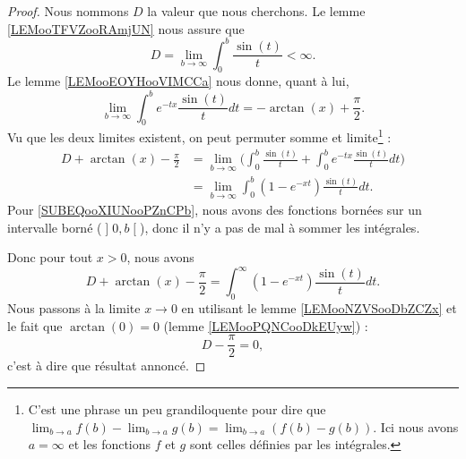 \begin{proof}
    Nous nommons \( D\) la valeur que nous cherchons. Le lemme \ref{LEMooTFVZooRAmjUN} nous assure que
    \begin{equation}
        D=\lim_{b\to \infty} \int_0^b\frac{ \sin(t) }{ t }<\infty.
    \end{equation}
    Le lemme \ref{LEMooEOYHooVIMCCa} nous donne, quant à lui,
    \begin{equation}
        \lim_{b\to \infty} \int_0^b e^{-tx}\frac{ \sin(t) }{ t }dt=-\arctan(x)+\frac{ \pi }{2}.
    \end{equation}
    Vu que les deux limites existent, on peut permuter somme et limite\footnote{C'est une phrase un peu grandiloquente pour dire que \( \lim_{b\to a} f(b)-\lim_{b\to a} g(b)=\lim_{b\to a} (f(b)-g(b))  \). Ici nous avons \( a=\infty\) et les fonctions \( f\) et \( g\) sont celles définies par les intégrales.} :
    \begin{subequations}
        \begin{align}
            D+\arctan(x)-\frac{ \pi }{2}&=\lim_{b\to \infty} \big(    \int_0^b\frac{ \sin(t) }{ t } +  \int_0^b e^{-tx}\frac{ \sin(t) }{ t }dt  \big)\\
            &=\lim_{b\to \infty} \int_0^b(1- e^{-xt})\frac{ \sin(t) }{ t }dt.    \label{SUBEQooXIUNooPZnCPb}
        \end{align}
    \end{subequations}
     Pour \eqref{SUBEQooXIUNooPZnCPb}, nous avons des fonctions bornées sur un intervalle borné (\( \mathopen] 0 , b \mathclose[\)), donc il n'y a pas de mal à sommer les intégrales.
         
         Donc pour tout \( x>0\), nous avons
         \begin{equation}
             D+\arctan(x)-\frac{ \pi }{2}=\int_0^{\infty}(1- e^{-xt})\frac{ \sin(t) }{ t }dt.
         \end{equation}
         Nous passons à la limite \( x\to 0\) en utilisant le lemme \ref{LEMooNZVSooDbZCZx} et le fait que \( \arctan(0)=0\) (lemme \ref{LEMooPQNCooDkEUyw}) :
         \begin{equation}
             D-\frac{ \pi }{2}=0,
         \end{equation}
         c'est à dire que résultat annoncé.
\end{proof}
